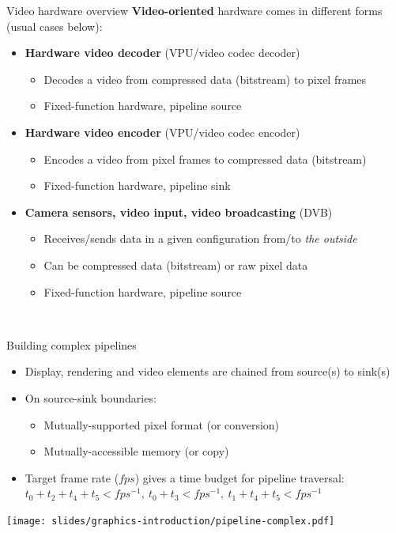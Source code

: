 \begin{frame}{Video hardware overview}
  \textbf{Video-oriented} hardware comes in different forms (usual cases below):

  \begin{itemize}
  \item \textbf{Hardware video decoder} (VPU/video codec decoder)
  \begin{itemize}
    \item Decodes a video from compressed data (bitstream) to pixel frames
    \item Fixed-function hardware, pipeline source
  \end{itemize}
  \item \textbf{Hardware video encoder} (VPU/video codec encoder)
  \begin{itemize}
    \item Encodes a video from pixel frames to compressed data (bitstream)
    \item Fixed-function hardware, pipeline sink
  \end{itemize}
  \item \textbf{Camera sensors, video input, video broadcasting} (DVB)
  \begin{itemize}
    \item Receives/sends data in a given configuration from/to \textit{the outside}
    \item Can be compressed data (bitstream) or raw pixel data
    \item Fixed-function hardware, pipeline source
  \end{itemize}
  \end{itemize}~
\end{frame}

\begin{frame}{Building complex pipelines}

  \begin{itemize}
  \item Display, rendering and video elements are chained from source(s) to sink(s)
  \item On source-sink boundaries:
    \begin{itemize}
    \item Mutually-supported pixel format (or conversion)
    \item Mutually-accessible memory (or copy)
    \end{itemize}
  \item Target frame rate (\(fps\)) gives a time budget for pipeline traversal:
  \( t_0 + t_2 + t_4 + t_5 < fps^{-1},~ t_0 + t_3 < fps^{-1},~ t_1 + t_4 + t_5 < fps^{-1} \)
  \end{itemize}

  \begin{center}
  \texttt{[image: slides/graphics-introduction/pipeline-complex.pdf]}
  \end{center}

\end{frame}

